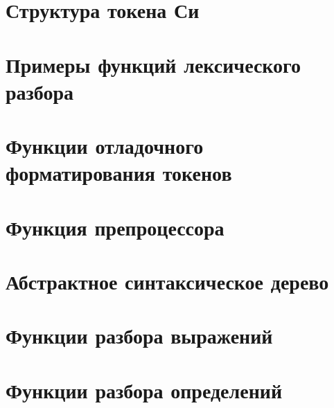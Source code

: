 

\section*{Структура токена Си}


\section*{Примеры функций лексического разбора}


\section*{Функции отладочного форматирования токенов}



\section*{Функция препроцессора}



\section*{Абстрактное синтаксическое дерево}


\section*{Функции разбора выражений}


\section*{Функции разбора определений}


